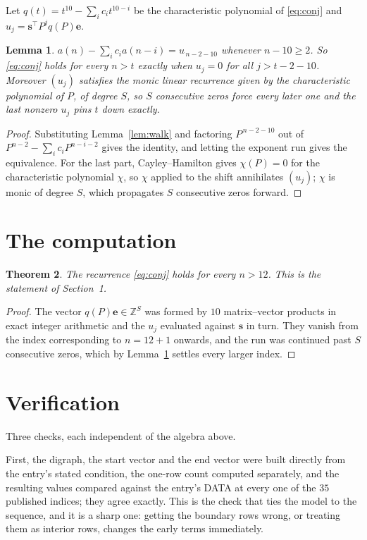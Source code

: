 \documentclass[11pt,a4paper]{article}
\theoremstyle{plain}
\newtheorem{theorem}{Theorem}
\newtheorem{lemma}[theorem]{Lemma}
\theoremstyle{definition}
\begin{document}
Let $q(t)=t^{10}-\sum_i c_i t^{10-i}$ be the characteristic polynomial of
\eqref{eq:conj} and $u_j=\mathbf{s}^{\!\top}P^{j}q(P)\mathbf{e}$.

\begin{lemma}\label{lem:crit}
$a(n)-\sum_i c_i a(n-i)=u_{\,n-2-10}$ whenever $n-10\ge2$. So \eqref{eq:conj}
holds for every $n>t$ exactly when $u_j=0$ for all $j>t-2-10$. Moreover $(u_j)$
satisfies the monic linear recurrence given by the characteristic polynomial of $P$, of
degree $S$, so $S$ consecutive zeros force every later one and the last nonzero $u_j$ pins
$t$ down exactly.
\end{lemma}

\begin{proof}
Substituting Lemma~\ref{lem:walk} and factoring $P^{\,n-2-10}$ out of
$P^{n-2}-\sum_i c_i P^{n-i-2}$ gives the identity, and letting the exponent run gives the
equivalence. For the last part, Cayley--Hamilton gives $\chi(P)=0$ for the characteristic
polynomial $\chi$, so $\chi$ applied to the shift annihilates $(u_j)$; $\chi$ is monic of
degree $S$, which propagates $S$ consecutive zeros forward.
\end{proof}

\section{The computation}

\begin{theorem}
The recurrence \eqref{eq:conj} holds for every $n>12$. This is the statement of
Section~1.
\end{theorem}

\begin{proof}
The vector $q(P)\mathbf{e}\in\mathbb{Z}^{S}$ was formed by $10$ matrix--vector
products in exact integer arithmetic and the $u_j$ evaluated against $\mathbf{s}$ in turn.
They vanish from the index corresponding to $n=12+1$ onwards, and the run was continued
past $S$ consecutive zeros, which by Lemma~\ref{lem:crit} settles every larger index.
\end{proof}

\section{Verification}

Three checks, each independent of the algebra above.

First, the digraph, the start vector and the end vector were built directly from the
entry's stated condition, the one-row count computed separately, and the resulting values
compared against the entry's DATA at every one of the $35$ published indices; they
agree exactly. This is the check that ties the model to the sequence, and it is a sharp one:
getting the boundary rows wrong, or treating them as interior rows, changes the early terms
immediately.
\end{document}
